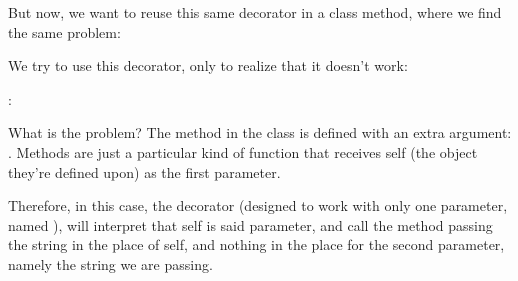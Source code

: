 \documentclass[a4paper,10pt,english]{sphinxmanual}
\begin{document}
\begin{sphinxVerbatim}[commandchars=\\\{\}]
\end{sphinxVerbatim}

But now, we want to reuse this same decorator in a class method, where we find the same
problem:

\begin{sphinxVerbatim}[commandchars=\\\{\}]
 
      
         
\end{sphinxVerbatim}

We try to use this decorator, only to realize that it doesn’t work:

\begin{sphinxVerbatim}[commandchars=\\\{\}]
: 
\end{sphinxVerbatim}

What is the problem? The method in the class is defined with an extra argument: . Methods are just a
particular kind of function that receives self (the object they’re defined upon) as the first parameter.

Therefore, in this case, the decorator (designed to work with only one parameter, named
), will interpret that self is said parameter, and call the method passing the
string in the place of self, and nothing in the place for the second parameter, namely the
string we are passing.
\end{document}
